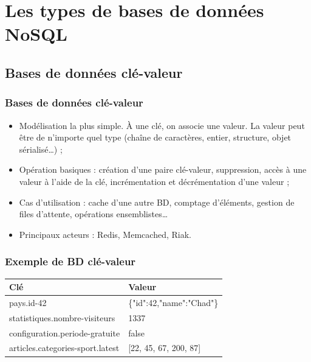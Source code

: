 \documentclass[handout]{beamer}
\begin{document}
	\section{Les types de bases de données NoSQL}

		\subsection{Bases de données clé-valeur}
		\begin{frame}
			\frametitle{Bases de données clé-valeur}

			\begin{itemize}
				\item Modélisation la plus simple. À une clé, on associe une valeur. La valeur peut être de n'importe quel type (chaîne de caractères, entier, structure, objet sérialisé\dots) ;
				\item Opération basiques : création d'une paire clé-valeur, suppression, accès à une valeur à l'aide de la clé, incrémentation et décrémentation d'une valeur ;
				\item Cas d'utilisation : cache d'une autre BD, comptage d'éléments, gestion de files d'attente, opérations ensemblistes\dots
				\item Principaux acteurs : Redis, Memcached, Riak.
			\end{itemize}

		\end{frame}

		\begin{frame}
			\frametitle{Exemple de BD clé-valeur}

			\begin{tabular}{|l|l|}
				\hline
				\textbf{Clé} & \textbf{Valeur} \\ \hline\hline
				pays.id-42 & \{"id":42,"name":"Chad"\} \\ \hline
				statistiques.nombre-visiteurs & 1337 \\ \hline
				configuration.periode-gratuite & false \\ \hline
				articles.categories-sport.latest & [22, 45, 67, 200, 87] \\ \hline
			\end{tabular}

		\end{frame}
\end{document}
